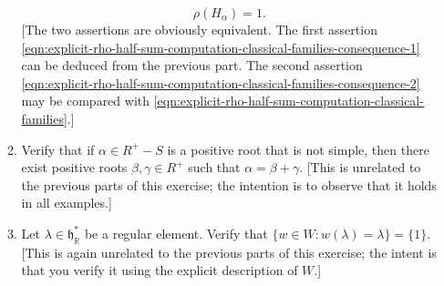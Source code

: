 \documentclass[reqno]{amsart} 
\begin{document}
\begin{homework}
\begin{enumerate}
\begin{enumerate}
\begin{equation}
        \rho(H_\alpha) = 1.
      \end{equation}
      [The two assertions are obviously equivalent.
      The first assertion \eqref{eqn:explicit-rho-half-sum-computation-classical-families-consequence-1} can be deduced from the previous part.
      The second assertion \eqref{eqn:explicit-rho-half-sum-computation-classical-families-consequence-2} 
      may be compared with
      \eqref{eqn:explicit-rho-half-sum-computation-classical-families}.]
    \item
      Verify that if $\alpha \in R^+ - S$ is a positive
      root that is not simple,
      then there exist positive roots $\beta, \gamma \in R^+$
      such that $\alpha = \beta + \gamma$.
      [This is unrelated to the previous parts of this exercise; the intention is to observe 
      that it holds in all examples.]
    \item
      Let $\lambda \in \mathfrak{h}^*_\mathbb{R}$
      be a regular element.
      Verify that $\{w \in W : w (\lambda) = \lambda \} =
      \{1\}$.
      [This is again unrelated to the previous parts of this
      exercise;
      the intent is that you verify it
      using the explicit description of $W$.]
    \end{enumerate}



\end{enumerate}
\end{homework}
\end{document}

